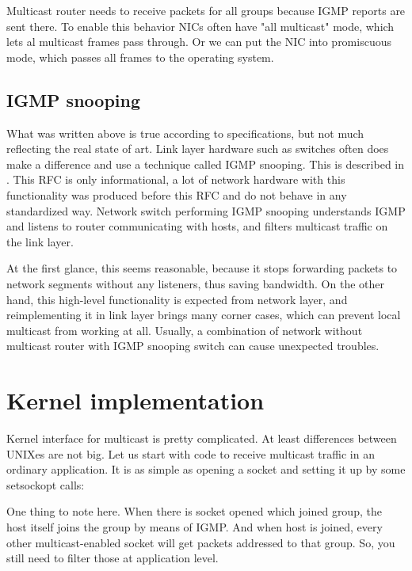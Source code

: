 Multicast router needs to receive packets for all groups because IGMP reports
are sent there. To enable this behavior NICs often have "all multicast" mode,
which lets al multicast frames pass through. Or we can put the NIC into
promiscuous mode, which passes all frames to the operating system.

\subsection{IGMP snooping}

What was written above is true according to specifications, but not much
reflecting the real state of art. Link layer hardware such as switches often does
make a difference and use a technique called IGMP snooping. This is described
in . This RFC is only informational, a lot of network hardware with
this functionality was produced before this RFC and do not behave in any
standardized way. Network switch performing IGMP snooping understands IGMP and
listens to router communicating with hosts, and filters multicast traffic on
the link layer.

At the first glance, this seems reasonable, because it stops forwarding packets
to network segments without any listeners, thus saving bandwidth. On the other
hand, this high-level functionality is expected from network layer, and
reimplementing it in link layer brings many corner cases, which can prevent
local multicast from working at all. Usually, a combination of network without
multicast router with IGMP snooping switch can cause unexpected troubles.

\section{Kernel implementation}

Kernel interface for multicast is pretty complicated. At least differences
between UNIXes are not big. Let us start with code to receive multicast traffic
in an ordinary application. It is as simple as opening a socket and setting it
up by some setsockopt calls:


\noindent One thing to note here. When there is socket opened which joined
group, the host itself joins the group by means of IGMP. And when host is
joined, every other multicast-enabled socket will get packets addressed to that
group. So, you still need to filter those at application level.

